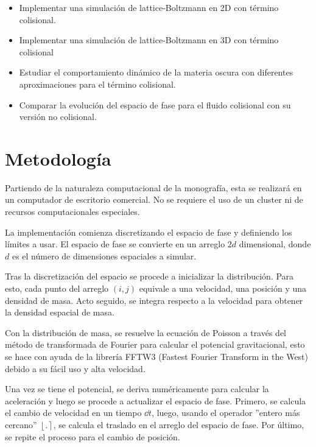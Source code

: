 \documentclass[12pt]{article}
\begin{document}

\begin{itemize}
	\item Implementar una simulación de lattice-Boltzmann en 2D con término colisional.
	\item Implementar una simulación de lattice-Boltzmann en 3D con término colisional
	\item Estudiar el comportamiento dinámico de la materia oscura
          con diferentes aproximaciones para el t\'ermino colisional. 
	\item Comparar la evolución del espacio de fase para el fluido
          colisional con su versión no colisional. 
\end{itemize}

\section{Metodología}

Partiendo de la naturaleza computacional de la monografía, esta se realizará en un computador de escritorio comercial. No se requiere el uso de un cluster ni de recursos computacionales especiales.


La implementación comienza discretizando el espacio de fase y
definiendo los límites a usar. El espacio de fase se convierte en un
arreglo $2d$ dimensional, donde $d$ es el número de dimensiones
espaciales a simular. 

Tras la discretización del espacio se procede a inicializar la
distribución.
Para esto, cada punto del arreglo $(i,j)$ equivale a una
velocidad, una posición y una densidad de masa. Acto seguido, se
integra respecto a la velocidad para obtener la densidad espacial de
masa. 
 
Con la distribución de masa, se resuelve la ecuación de Poisson a
través del método de transformada de Fourier para calcular el
potencial gravitacional, esto se hace con ayuda de la librería FFTW3
(Fastest Fourier Transform in the West) debido a    su fácil uso y
alta velocidad.

Una vez se tiene el potencial, se deriva numéricamente para calcular
la aceleración y luego se procede a actualizar el espacio de
fase. Primero, se calcula el cambio de velocidad en un tiempo $\dd t$,
luego, usando el operador ''entero más cercano''
$\left\lfloor{.}\right\rceil$, se calcula el traslado en el arreglo
del espacio de fase. Por último, se repite el proceso para el cambio
de posición. 
\end{document}
